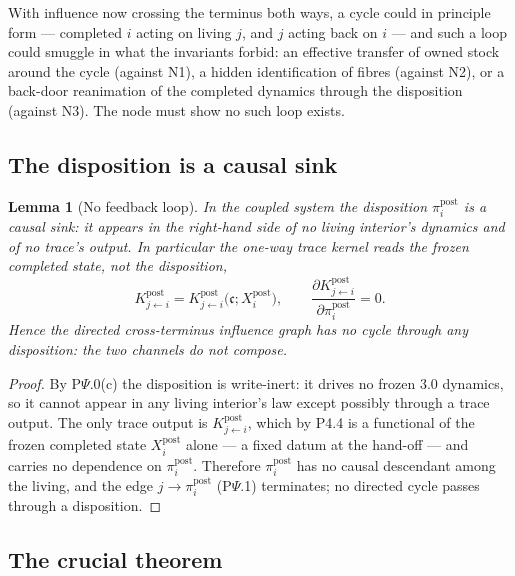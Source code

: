 \documentclass[11pt,a4paper]{article}
\newcommand{\cint}{\ensuremath{\mathfrak c}}
\theoremstyle{definition}
\theoremstyle{plain}
\newtheorem{lemma}[definition]{Lemma}
\theoremstyle{remark}
\begin{document}
With influence now crossing the terminus both ways, a cycle could in principle form ---
completed \(i\) acting on living \(j\), and \(j\) acting back on \(i\) --- and such a loop could
smuggle in what the invariants forbid: an effective transfer of owned stock around the cycle
(against N1), a hidden identification of fibres (against N2), or a back-door reanimation of the
completed dynamics through the disposition (against N3). The node must show no such loop exists.

\subsection{The disposition is a causal sink}

\begin{lemma}[No feedback loop]\label{lem:noloop}
In the coupled system the disposition \(\pi_i^{\mathrm{post}}\) is a causal sink: it appears in
the right-hand side of no living interior's dynamics and of no trace's output. In particular
the one-way trace kernel reads the \emph{frozen} completed state, not the disposition,
\[
K^{\mathrm{post}}_{j\leftarrow i}=K^{\mathrm{post}}_{j\leftarrow i}\bigl(\cint;X_i^{\mathrm{post}}\bigr),
\qquad
\frac{\partial K^{\mathrm{post}}_{j\leftarrow i}}{\partial \pi_i^{\mathrm{post}}}=0 .
\]
Hence the directed cross-terminus influence graph has no cycle through any disposition: the two
channels do not compose.
\end{lemma}

\begin{proof}
By P$\Psi$.0(c) the disposition is write-inert: it drives no frozen 3.0 dynamics, so it cannot
appear in any living interior's law except possibly through a trace output. The only trace
output is \(K^{\mathrm{post}}_{j\leftarrow i}\), which by P4.4 is a functional of the frozen
completed state \(X_i^{\mathrm{post}}\) alone --- a fixed datum at the hand-off --- and carries
no dependence on \(\pi_i^{\mathrm{post}}\). Therefore \(\pi_i^{\mathrm{post}}\) has no causal
descendant among the living, and the edge \(j\to\pi_i^{\mathrm{post}}\) (P$\Psi$.1) terminates;
no directed cycle passes through a disposition. \qedhere
\end{proof}

\subsection{The crucial theorem}
\end{document}
